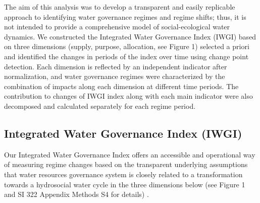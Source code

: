 The aim of this analysis was to develop a transparent and easily replicable approach to identifying water governance regimes and regime shifts; thus, it is not intended to provide a comprehensive model of social-ecological water dynamics. We constructed the Integrated Water Governance Index (IWGI) based on three dimensions (supply, purpose, allocation, see Figure 1) selected a priori and identified the changes in periods of the index over time using change point detection. Each dimension is reflected by an independent indicator after normalization, and water governance regimes were characterized by the combination of impacts along each dimension at different time periods. The contribution to changes of IWGI index along with each main indicator were also decomposed and calculated separately for each regime period.

\subsection{Integrated Water Governance Index (IWGI)}

Our Integrated Water Governance Index offers an accessible and operational way of measuring regime changes based on the transparent underlying assumptions that water resources governance system is closely related to a transformation towards a hydrosocial water cycle in the three dimensions below (see Figure 1 and SI 322 Appendix Methods S4 for details)
\cite{abbottwatercycleAnthropocene2019,leviaHomogenizationterrestrialwater2020,steffenTrajectoriesEarthSystem2018}.

